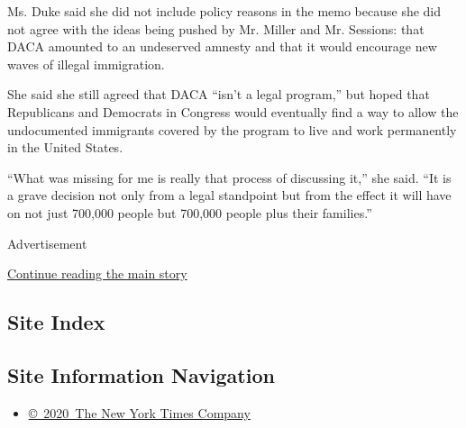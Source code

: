 Ms. Duke said she did not include policy reasons in the memo because she
did not agree with the ideas being pushed by Mr. Miller and Mr.
Sessions: that DACA amounted to an undeserved amnesty and that it would
encourage new waves of illegal immigration.

She said she still agreed that DACA ``isn't a legal program,'' but hoped
that Republicans and Democrats in Congress would eventually find a way
to allow the undocumented immigrants covered by the program to live and
work permanently in the United States.

``What was missing for me is really that process of discussing it,'' she
said. ``It is a grave decision not only from a legal standpoint but from
the effect it will have on not just 700,000 people but 700,000 people
plus their families.''

Advertisement

\protect\hyperlink{after-bottom}{Continue reading the main story}

\hypertarget{site-index}{%
\subsection{Site Index}\label{site-index}}

\hypertarget{site-information-navigation}{%
\subsection{Site Information
Navigation}\label{site-information-navigation}}

\begin{itemize}
\tightlist
\item
  \href{https://help.nytimes.com/hc/en-us/articles/115014792127-Copyright-notice}{©~2020~The
  New York Times Company}
\end{itemize}

